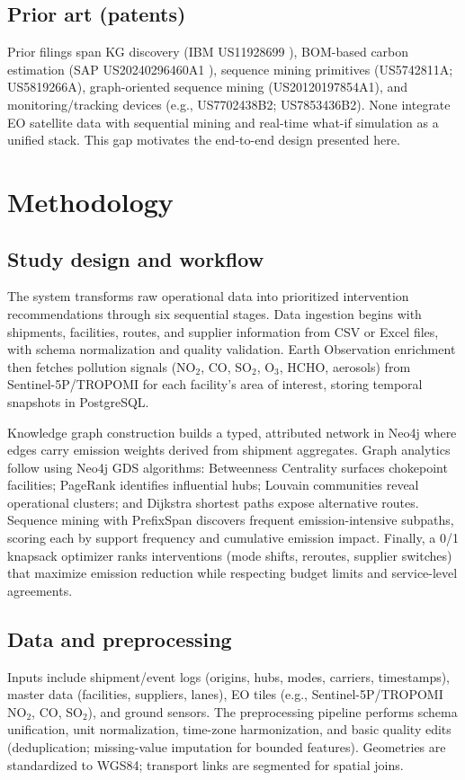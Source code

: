 \documentclass[conference]{IEEEtran}
\begin{document}
\subsection{Prior art (patents)}\label{subsec:prior}
Prior filings span KG discovery (IBM US11928699 \cite{ibm2023autodiscovery}), BOM-based carbon estimation (SAP US20240296460A1 \cite{sap2024carbon}), sequence mining primitives (US5742811A; US5819266A), graph-oriented sequence mining (US20120197854A1), and monitoring/tracking devices (e.g., US7702438B2; US7853436B2). None integrate EO satellite data with sequential mining and real-time what-if simulation as a unified stack. This gap moti\-vates the end-to-end design presented here.

\section{Methodology}
\subsection{Study design and workflow}
The system transforms raw operational data into prioritized intervention recommendations through six sequential stages. Data ingestion begins with shipments, facilities, routes, and supplier information from CSV or Excel files, with schema normalization and quality validation. Earth Observation enrichment then fetches pollution signals (NO$_2$, CO, SO$_2$, O$_3$, HCHO, aerosols) from Sentinel-5P/TROPOMI for each facility's area of interest, storing temporal snapshots in PostgreSQL. 

Knowledge graph construction builds a typed, attributed network in Neo4j where edges carry emission weights derived from shipment aggregates. Graph analytics follow using Neo4j GDS algorithms: Betweenness Centrality surfaces chokepoint facilities; PageRank identifies influential hubs; Louvain communities reveal operational clusters; and Dijkstra shortest paths expose alternative routes. Sequence mining with PrefixSpan discovers frequent emission-intensive subpaths, scoring each by support frequency and cumulative emission impact. Finally, a 0/1 knapsack optimizer ranks interventions (mode shifts, reroutes, supplier switches) that maximize emission reduction while respecting budget limits and service-level agreements.

\subsection{Data and preprocessing}
Inputs include shipment/event logs (origins, hubs, modes, carriers, timestamps), master data (facilities, suppliers, lanes), EO tiles (e.g., Sentinel-5P/TROPOMI NO$_2$, CO, SO$_2$), and ground sensors. The preprocessing pipeline performs schema unification, unit normalization, time-zone harmonization, and basic quality edits (deduplication; missing-value imputation for bounded features). Geometries are standardized to WGS84; transport links are segmented for spatial joins.
\end{document}
